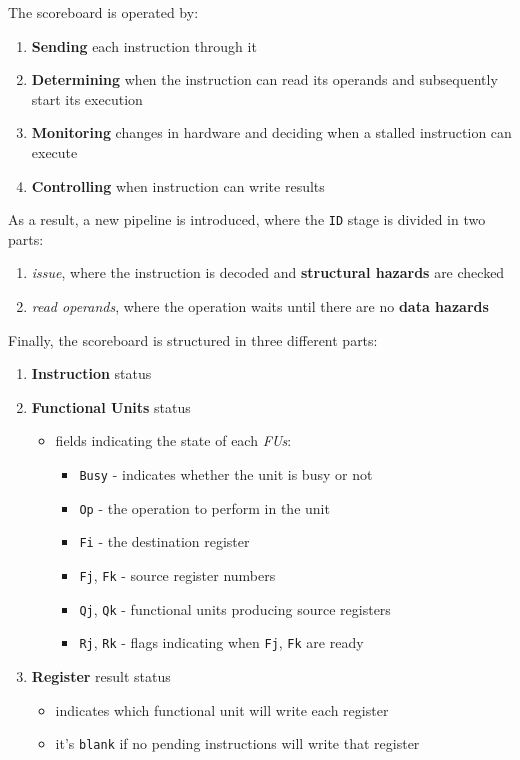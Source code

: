\documentclass[english]{article}
\begin{document}
\bigskip
The scoreboard is operated by:

\begin{enumerate}
  \item \textbf{Sending} each instruction through it
  \item \textbf{Determining} when the instruction can read its operands and subsequently start its execution
  \item \textbf{Monitoring} changes in hardware and deciding when a stalled instruction can execute
  \item \textbf{Controlling} when instruction can write results
\end{enumerate}

As a result, a new pipeline is introduced, where the \texttt{ID} stage  is divided in two parts:
\begin{enumerate}
  \item \textit{issue}, where the instruction is decoded and \textbf{structural hazards} are checked
  \item \textit{read operands}, where the operation waits until there are no \textbf{data hazards}
\end{enumerate}

Finally, the scoreboard is structured in three different parts:
\begin{enumerate}
  \item \textbf{Instruction} status
  \item \textbf{Functional Units} status
        \begin{itemize}
          \item fields indicating the state of each \textit{FUs}:
                \begin{itemize}
                  \item \texttt{Busy} - indicates whether the unit is busy or not
                  \item \texttt{Op} - the operation to perform in the unit
                  \item \texttt{Fi} - the destination register
                  \item \texttt{Fj}, \texttt{Fk} - source register numbers
                  \item \texttt{Qj}, \texttt{Qk} - functional units producing source registers
                  \item \texttt{Rj}, \texttt{Rk} - flags indicating when \texttt{Fj}, \texttt{Fk} are ready
                \end{itemize}
        \end{itemize}
  \item \textbf{Register} result status
        \begin{itemize}
          \item indicates which functional unit will write each register
          \item it's \texttt{blank} if no pending instructions will write that register
        \end{itemize}
\end{enumerate}
\end{document}
